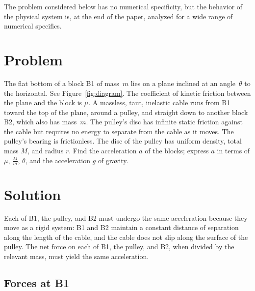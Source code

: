 \documentclass[twocolumn]{article}
\begin{document}
The problem considered below has no numerical specificity, but the behavior of
the physical system is, at the end of the paper, analyzed for a wide range of
numerical specifics.

\section{Problem}

The flat bottom of a block B1 of mass~$m$ lies on a plane inclined at an
angle~$\theta$ to the horizontal. See Figure~\ref{fig:diagram}. The coefficient
of kinetic friction between the plane and the block is $\mu$.  A massless,
taut, inelastic cable runs from B1 toward the top of the plane, around a
pulley, and straight down to another block B2, which also has mass~$m$.  The
pulley's disc has infinite static friction against the cable but requires no
energy to separate from the cable as it moves. The pulley's bearing is
frictionless. The disc of the pulley has uniform density, total mass $M$, and
radius $r$. Find the acceleration $a$ of the blocks; express $a$ in terms of
$\mu$, $\tfrac{M}{m}$, $\theta$, and the acceleration $g$ of gravity.

\section{Solution}

Each of B1, the pulley, and B2 must undergo the same acceleration because they
move as a rigid system: B1 and B2 maintain a constant distance of separation
along the length of the cable, and the cable does not slip along the surface of
the pulley.  The net force on each of B1, the pulley, and B2, when divided by
the relevant mass, must yield the same acceleration.

\subsection{Forces at B1}
\end{document}
